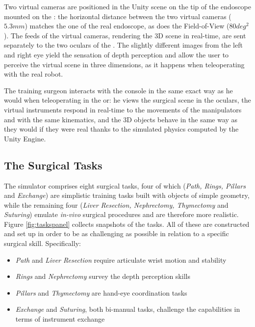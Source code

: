 \documentclass[../main.tex]{subfiles}
\begin{document}
Two virtual cameras are positioned in the Unity scene on the tip of the endoscope mounted on the \ecm: the horizontal distance between the two virtual cameras ($5.3 \unit{mm}$) matches the one of the real endoscope, as does the Field-of-View ($80 \unit{deg^2}$). The feeds of the virtual cameras, rendering the 3D scene in real-time, are sent separately to the two oculars of the \hrsv. The slightly different images from the left and right eye yield the sensation of depth perception and allow the user to perceive the virtual scene in three dimensions, as it happens when teleoperating with the real robot. 

The training surgeon interacts with the console in the same exact way as he would when teleoperating in the \ac{or}: he views the surgical scene in the oculars, the virtual instruments respond in real-time to the movements of the manipulators and with the same kinematics, and the 3D objects behave in the same way as they would if they were real thanks to the simulated physics computed by the Unity Engine.   

\subsection{The Surgical Tasks}
The simulator comprises eight surgical tasks, four of which (\textit{Path, Rings, Pillars} and \textit{Exchange}) are simplistic training tasks built with objects of simple geometry, while the remaining four (\textit{Liver Resection, Nephrectomy, Thymectomy} and \textit{Suturing}) emulate \textit{in-vivo} surgical procedures and are therefore more realistic. Figure \ref{fig:taskspanel} collects snapshots of the tasks. All of these are constructed and set up in order to be as challenging as possible in relation to a specific surgical skill. Specifically:

\begin{itemize}
  \item \textit{Path} and \textit{Liver Resection} require articulate wrist motion and stability
  \item \textit{Rings} and \textit{Nephrectomy} survey the depth perception skills
  \item \textit{Pillars} and \textit{Thymectomy} are hand-eye coordination tasks
  \item \textit{Exchange} and \textit{Suturing}, both bi-manual tasks, challenge the capabilities in terms of instrument exchange 
\end{itemize}
\end{document}
